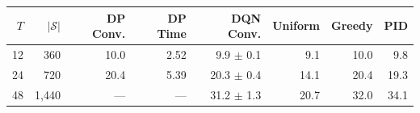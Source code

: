 \begin{tabular}{r r r r r r r r}
\toprule
$T$ & $|\mathcal{S}|$ & DP Conv. & DP Time & DQN Conv. & Uniform & Greedy & PID \\
\midrule
12 & 360 & 10.0 & 2.52 & 9.9 $\pm$ 0.1 & 9.1 & 10.0 & 9.8 \\
24 & 720 & 20.4 & 5.39 & 20.3 $\pm$ 0.4 & 14.1 & 20.4 & 19.3 \\
48 & 1,440 & --- & --- & 31.2 $\pm$ 1.3 & 20.7 & 32.0 & 34.1 \\
\bottomrule
\end{tabular}